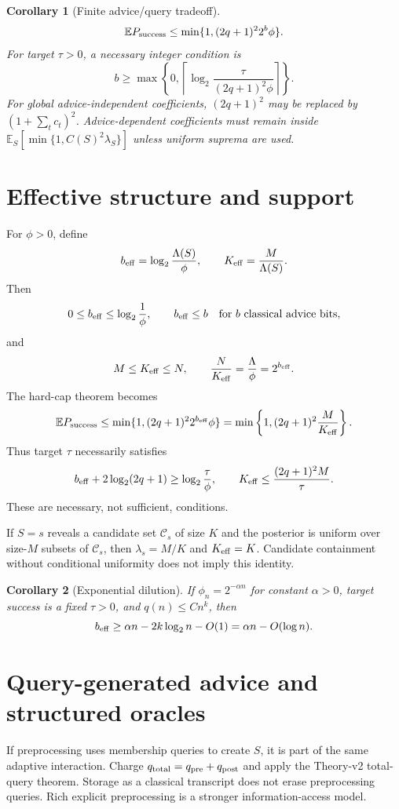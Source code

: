 \documentclass[11pt]{article}
\newtheorem{corollary}{Corollary}
\newcommand{\E}{\mathbb E}
\begin{document}
\begin{corollary}[Finite advice/query tradeoff]
\[
 \E P_{\rm success}\le\min\{1,(2q+1)^2 2^b\phi\}.
\]
For target $\tau>0$, a necessary integer condition is
\[
 b\ge\max\left\{0,
 \left\lceil\log_2\frac{\tau}{(2q+1)^2\phi}\right\rceil
 \right\}.
\]
For global advice-independent coefficients, $(2q+1)^2$ may be replaced by
$(1+\sum_t c_t)^2$.  Advice-dependent coefficients must remain inside
$\E_S[\min\{1,C(S)^2\lambda_S\}]$ unless uniform suprema are used.
\end{corollary}

\section{Effective structure and support}
For $\phi>0$, define
\[
 b_{\rm eff}=\log_2\frac{\Lambda(S)}{\phi},
 \qquad
 K_{\rm eff}=\frac{M}{\Lambda(S)}.
\]
Then
\[
 0\le b_{\rm eff}\le\log_2\frac1\phi,
 \qquad b_{\rm eff}\le b\quad\hbox{for $b$ classical advice bits},
\]
and
\[
 M\le K_{\rm eff}\le N,
 \qquad
 \frac{N}{K_{\rm eff}}=\frac{\Lambda}{\phi}=2^{b_{\rm eff}}.
\]
The hard-cap theorem becomes
\[
 \E P_{\rm success}
 \le\min\{1,(2q+1)^2 2^{b_{\rm eff}}\phi\}
 =\min\left\{1,(2q+1)^2\frac{M}{K_{\rm eff}}\right\}.
\]
Thus target $\tau$ necessarily satisfies
\[
 b_{\rm eff}+2\log_2(2q+1)\ge\log_2\frac{\tau}{\phi},
 \qquad
 K_{\rm eff}\le\frac{(2q+1)^2M}{\tau}.
\]
These are necessary, not sufficient, conditions.

If $S=s$ reveals a candidate set $\mathcal C_s$ of size $K$ and the posterior
is uniform over size-$M$ subsets of $\mathcal C_s$, then
$\lambda_s=M/K$ and $K_{\rm eff}=K$.  Candidate containment without
conditional uniformity does not imply this identity.

\begin{corollary}[Exponential dilution]
If $\phi_n=2^{-\alpha n}$ for constant $\alpha>0$, target success is a fixed
$\tau>0$, and $q(n)\le Cn^k$, then
\[
 b_{\rm eff}\ge\alpha n-2k\log_2n-O(1)
 =\alpha n-O(\log n).
\]
\end{corollary}

\section{Query-generated advice and structured oracles}
If preprocessing uses membership queries to create $S$, it is part of the
same adaptive interaction.  Charge
$q_{\rm total}=q_{\rm pre}+q_{\rm post}$ and apply the Theory-v2 total-query
theorem.  Storage as a classical transcript does not erase preprocessing
queries.  Rich explicit preprocessing is a stronger information-access model.
\end{document}
